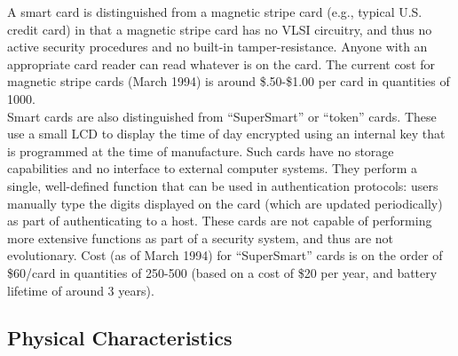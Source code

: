 A smart card is distinguished from a magnetic stripe card (e.g.,
typical U.S. credit card) in that a magnetic stripe card has no VLSI
circuitry, and thus no active security procedures and no built-in
tamper-resistance. Anyone with an appropriate card reader can read
whatever is on the card. The current cost for magnetic stripe cards
(March 1994) is around \$.50-\$1.00 per card in quantities of 1000.\\

Smart cards are also distinguished from ``SuperSmart'' or ``token''
cards. These use a small LCD to display the time of day encrypted using
an internal key that is programmed at the time of manufacture. Such
cards have no storage capabilities and no interface to external
computer systems. They perform a single, well-defined function that can
be used in authentication protocols: users manually type the digits
displayed on the card (which are updated periodically) as part of
authenticating to a host. These cards are not capable of performing
more extensive functions as part of a security system, and thus are not
evolutionary. Cost (as of March 1994) for ``SuperSmart'' cards is on
the order of \$60/card in quantities of 250-500 (based on a cost of \$20
per year, and battery lifetime of around 3 years).

\subsection{Physical Characteristics}

